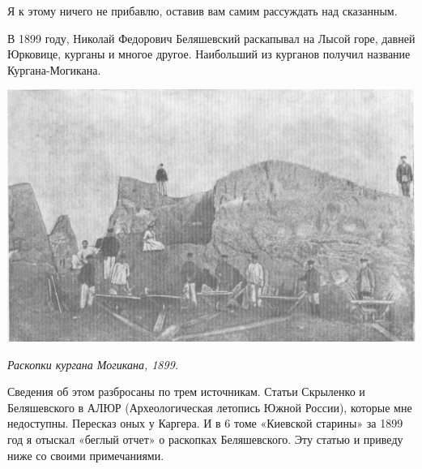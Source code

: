 Я к этому ничего не прибавлю, оставив вам самим рассуждать над сказанным.

В 1899 году, Николай Федорович Беляшевский раскапывал на Лысой горе, давней Юрковице, курганы и многое другое. Наибольший из курганов получил название Кургана-Могикана.

\begin{center}
\includegraphics[width=\linewidth]{chast-kirvys/lys02/1899-mogikan.jpg}

\textit{Раскопки кургана Могикана, 1899.}
\end{center} 

Сведения об этом разбросаны по трем источникам. Статьи Скрыленко и Беляшевского в АЛЮР (Археологическая летопись Южной России), которые мне недоступны. Пересказ оных у Каргера. И в 6 томе «Киевской старины» за 1899 год я отыскал «беглый отчет» о раскопках Беляшевского. Эту статью и приведу ниже со своими примечаниями.





